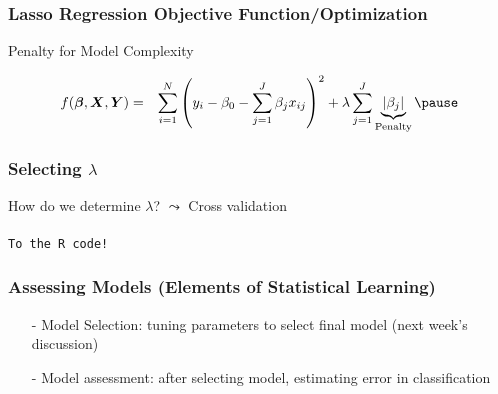 \documentclass{beamer}
\numberwithin{equation}{section}
\begin{document}
\begin{frame}
\frametitle{Lasso Regression Objective Function/Optimization}

Penalty for Model Complexity

\begin{eqnarray}
f(\boldsymbol{\beta}, \boldsymbol{X}, \boldsymbol{Y} ) & = & \sum_{i=1}^{N} \left(y_{i} - \beta_{0} - \sum_{j=1}^{J} \beta_{j} x_{ij}  \right)^{2} + \lambda \sum_{j=1}^{J} \underbrace{|\beta_{j}|}_{\text{Penalty}} \nonumber \pause
\end{eqnarray}


\begin{itemize}
 \pause
\begin{itemize}
 \pause
{} \pause
{} \pause
\end{itemize}
\end{itemize}

\end{frame}



\begin{frame}
\frametitle{Selecting $\lambda$}

How do we determine $\lambda$? $\leadsto$ Cross validation  \pause \\
 \pause \\

{\tt To the R code!}

\end{frame}



\begin{frame}
\frametitle{Assessing Models (Elements of Statistical Learning) }


\begin{itemize}
\item[-] \alert{Model Selection}: tuning parameters to select final model (next week's discussion)
\item[-] \alert{Model assessment}: after selecting model, estimating error in classification
\end{itemize}


\end{frame}
\end{document}
